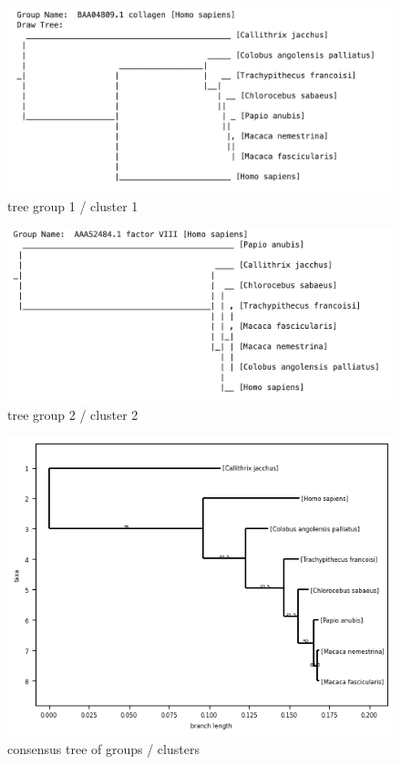 \documentclass[a4paper, 12pt, one column]{article}
\begin{document}
\begin{figure}[H]
    \centering
    \includegraphics[width=.8\linewidth]{tree_group0.png}
    \caption{tree group 1 / cluster 1}
    \label{fig:tree_group11}
\end{figure}
\begin{figure}[H]
    \centering
    \includegraphics[width=.8\linewidth]{tree_group1.png}
    \caption{tree group 2 / cluster 2}
    \label{fig:tree_group21}
\end{figure}   
\begin{figure}[H]
    \centering
    \includegraphics[width=.8\linewidth]{concensus_tree_of_groups.png}
    \caption{consensus tree of groups / clusters}
    \label{fig:concensus_tree.png}
\end{figure}  


\end{document}
